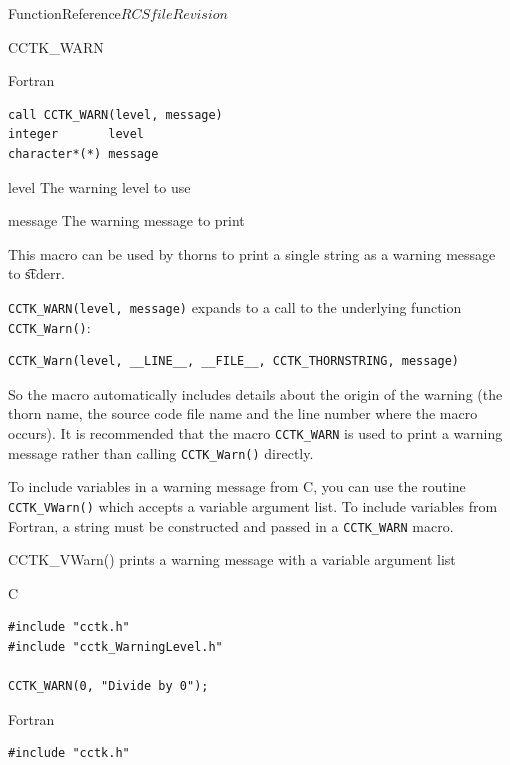 \begin{cactuspart}{FunctionReference}{$RCSfile$}{$Revision$}
\begin{FunctionDescription}{CCTK\_WARN}
\begin{SynopsisSection}
\begin{Synopsis}{Fortran}
\begin{verbatim}
call CCTK_WARN(level, message)
integer       level
character*(*) message
\end{verbatim}
\end{Synopsis}
\end{SynopsisSection}

\begin{ParameterSection}
\begin{Parameter}{level}
The warning level to use
\end{Parameter}
\begin{Parameter}{message}
The warning message to print
\end{Parameter}
\end{ParameterSection}

\begin{Discussion}
This macro can be used by thorns to print a single string as a warning message
to {\t stderr}.

{\tt CCTK\_WARN(level, message)} expands to a call to the underlying function
{\tt CCTK\_Warn()}:

\begin{verbatim}
CCTK_Warn(level, __LINE__, __FILE__, CCTK_THORNSTRING, message)
\end{verbatim}

So the macro automatically includes details about the origin of the warning
(the thorn name, the source code file name and the line number where the macro
occurs). It is recommended that the macro {\tt CCTK\_WARN} is used
to print a warning message rather than calling {\tt CCTK\_Warn()} directly.

To include variables in a warning message from C, you can use the routine
{\tt CCTK\_VWarn()} which accepts a variable argument list.
To include variables from Fortran, a string must be constructed and passed
in a {\tt CCTK\_WARN} macro.
\end{Discussion}

\begin{SeeAlsoSection}
\begin{SeeAlso}{CCTK\_VWarn()}
prints a warning message with a variable argument list
\end{SeeAlso}
\end{SeeAlsoSection}

\begin{ExampleSection}
\begin{Example}{C}
\begin{verbatim}
#include "cctk.h"
#include "cctk_WarningLevel.h"

CCTK_WARN(0, "Divide by 0");
\end{verbatim}
\end{Example}
\begin{Example}{Fortran}
\begin{verbatim}
#include "cctk.h"


\end{verbatim}
\end{Example}
\end{ExampleSection}
\end{FunctionDescription}
\end{cactuspart}

